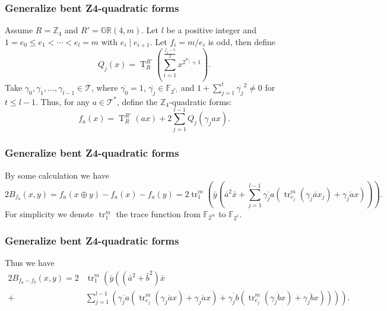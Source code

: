 \documentclass[
    aspectratio=169,                   %
]{beamer}
\newcommand{\Z}{\mathbb{Z}}
\newcommand{\GR}{\mathbb{GR}}
\newcommand{\F}{\mathbb{F}}
\newcommand{\tr}{\operatorname{tr}}
\newcommand{\gtr}{\operatorname{T}}
\begin{document}
    \begin{frame}
        \frametitle{ Generalize bent Z4-quadratic forms}
        
        Assume $ R=\Z_4 $ and $ R'=\GR(4,m) $.
        Let $ l $ be a positive integer and $ 1=e_0\leq e_1<\cdots<e_l=m $ with $ e_i\mid e_{i+1} $.
        Let $ f_i=m/e_i $ is odd, then define 
        \[Q_j(x)=\gtr_{R}^{R'}(\sum_{i=1}^{\frac{f_j-1}{2}}x^{2^{ie_j}+1}).\]
        Take $ \gamma_0,\gamma_1,\dots,\gamma_{l-1}\in\mathcal{T}  $, where $ \overline{\gamma_0}=1 $, $ \overline{\gamma_j}\in\F_{2^{e_j}} $ 
        and $ 1+\sum_{j=1}^{t}\overline{\gamma_j}^2\neq 0 $ for $ t\leq l-1 $. 
        Thus, for any $ a\in\mathcal{T}^* $, define the $\Z_4$-quadratic forms:
        \[f_{a}(x)=\gtr_{R}^{R'}(a x)+2 \sum_{j=1}^{l-1} Q_{j}\left(\gamma_{j} a x\right).\]
    \end{frame}
    \begin{frame}
        \frametitle{Generalize bent Z4-quadratic forms}
    
        By some calculation we have 
        \[2B_{f_a}(x,y)=f_a(x\oplus y)-f_a(x)-f_a(y)=2 \tr_{1}^{m}\left(\bar{y}\left(\bar{a}^{2} \bar{x}+\sum_{j=1}^{l-1} \overline{\gamma_{j} a}\left(\tr_{e_{j}}^{m}\left(\overline{\gamma_{j} a x_{j}}\right)+\overline{\gamma_{j} a x}\right)\right)\right). \]
        For simplicity we denote $ \tr_1^m $ the trace function from $ \F_{2^m} $ to $ \F_{2^1} $.
    \end{frame}
    \begin{frame}
        \frametitle{Generalize bent Z4-quadratic forms}
    
        Thus we have 
        \begin{align*}
            2B_{f_a-f_b}(x,y)=2&\tr_{1}^{m}\left(\bar{y}\left((\bar{a}^{2}+\bar{b}^{2}) \bar{x}\right.\right.\\
            +&\left.\left.\sum_{j=1}^{l-1} \left(\overline{\gamma_{j} a}\left(\tr_{e_{j}}^{m}\left(\overline{\gamma_{j}ax}\right)+\overline{\gamma_{j}ax}\right)
            +\overline{\gamma_{j} b}\left(\tr_{e_{j}}^{m}\left(\overline{\gamma_{j}bx}\right)+\overline{\gamma_{j} b x}\right)\right)\right)\right).
        \end{align*}
    \end{frame}
\end{document}

